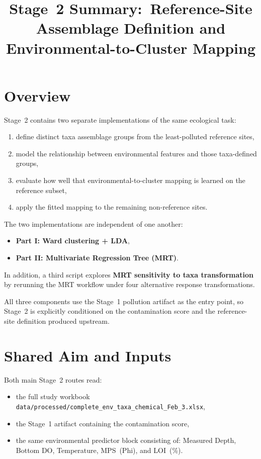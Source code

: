 \documentclass[11pt]{article}
\title{Stage~2 Summary:\
Reference-Site Assemblage Definition and Environmental-to-Cluster Mapping}
\author{}
\date{}
\begin{document}
\maketitle

\section{Overview}

Stage~2 contains two separate implementations of the same ecological task:
\begin{enumerate}[leftmargin=*]
  \item define distinct taxa assemblage groups from the least-polluted reference sites,
  \item model the relationship between environmental features and those taxa-defined groups,
  \item evaluate how well that environmental-to-cluster mapping is learned on the reference subset,
  \item apply the fitted mapping to the remaining non-reference sites.
\end{enumerate}

The two implementations are independent of one another:
\begin{itemize}[leftmargin=*]
  \item \textbf{Part I: Ward clustering + LDA},
  \item \textbf{Part II: Multivariate Regression Tree (MRT)}.
\end{itemize}

In addition, a third script explores \textbf{MRT sensitivity to taxa transformation} by rerunning the MRT workflow under four alternative response transformations.

All three components use the Stage~1 pollution artifact as the entry point, so Stage~2 is explicitly conditioned on the contamination score and the reference-site definition produced upstream.

\section{Shared Aim and Inputs}

Both main Stage~2 routes read:
\begin{itemize}[leftmargin=*]
  \item the full study workbook
  \texttt{data/processed/complete\_env\_taxa\_chemical\_Feb\_3.xlsx},
  \item the Stage~1 artifact containing the contamination score,
  \item the same environmental predictor block consisting of:
  Measured Depth, Bottom DO, Temperature, MPS~(Phi), and LOI~(\%).
\end{itemize}
\end{document}
